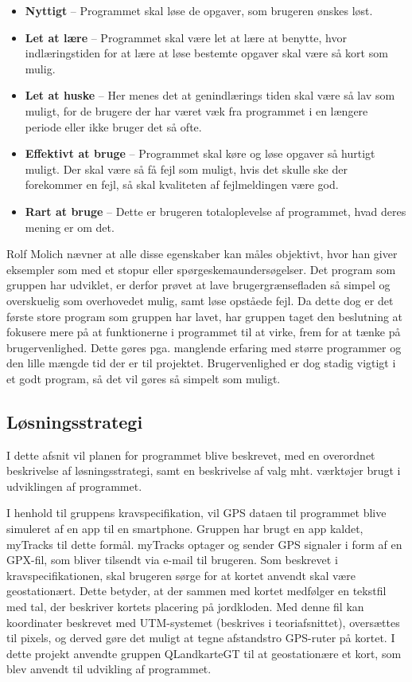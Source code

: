 \begin{itemize}
	\item \textbf{Nyttigt} – Programmet skal løse de opgaver, som brugeren ønskes løst. 
	\item \textbf{Let at lære} – Programmet skal være let at lære at benytte, hvor indlæringstiden for at lære at løse bestemte opgaver skal være så kort som mulig.
	\item \textbf{Let at huske} – Her menes det at genindlærings tiden skal være så lav som muligt, for de brugere der har været væk fra programmet i en længere periode eller ikke bruger det så ofte. 
	\item \textbf{Effektivt at bruge} – Programmet skal køre og løse opgaver så hurtigt muligt. Der skal være så få fejl som muligt, hvis det skulle ske der forekommer en fejl, så skal kvaliteten af fejlmeldingen være god.
	\item \textbf{Rart at bruge} – Dette er brugeren totaloplevelse af programmet, hvad deres mening er om det.
\end{itemize}

Rolf Molich nævner at alle disse egenskaber kan måles objektivt, hvor han giver eksempler som med et stopur eller spørgeskemaundersøgelser. Det program som gruppen har udviklet, er derfor prøvet at lave brugergrænsefladen så simpel og overskuelig som overhovedet mulig, samt løse opståede fejl. Da dette dog er det første store program som gruppen har lavet, har gruppen taget den beslutning at fokusere mere på at funktionerne i programmet til at virke, frem for at tænke på brugervenlighed.  Dette gøres pga. manglende erfaring med større programmer og den lille mængde tid der er til projektet. Brugervenlighed er dog stadig vigtigt i et godt program, så det vil gøres så simpelt som muligt. 

\subsection{Løsningsstrategi}
I dette afsnit vil planen for programmet blive beskrevet, med en overordnet beskrivelse af løsningsstrategi, samt en beskrivelse af valg mht. værktøjer brugt i udviklingen af programmet.

I henhold til gruppens kravspecifikation, vil GPS dataen til programmet blive simuleret af en app til en smartphone. Gruppen har brugt en app kaldet, myTracks til dette formål. myTracks optager og sender GPS signaler i form af en GPX-fil, som bliver tilsendt via e-mail til brugeren.
Som beskrevet i kravspecifikationen, skal brugeren sørge for at kortet anvendt skal være geostationært. Dette betyder, at der sammen med kortet medfølger en tekstfil med tal, der beskriver kortets placering på jordkloden. Med denne fil kan koordinater beskrevet med UTM-systemet (beskrives i teoriafsnittet), oversættes til pixels, og derved gøre det muligt at tegne afstandstro GPS-ruter på kortet. I dette projekt anvendte gruppen QLandkarteGT til at geostationære et kort, som blev anvendt til udvikling af programmet.


